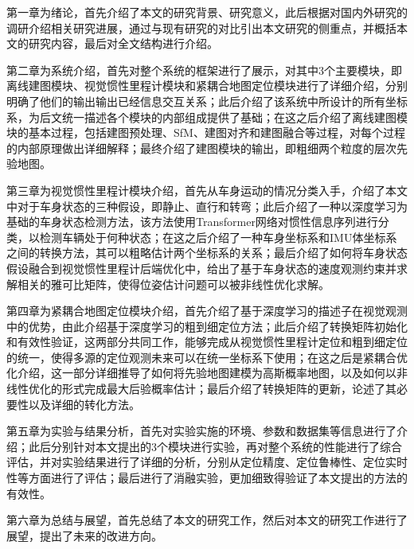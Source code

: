第一章为绪论，首先介绍了本文的研究背景、研究意义，此后根据对国内外研究的调研介绍相关研究进展，通过与现有研究的对比引出本文研究的侧重点，并概括本文的研究内容，最后对全文结构进行介绍。

第二章为系统介绍，首先对整个系统的框架进行了展示，对其中3个主要模块，即离线建图模块、视觉惯性里程计模块和紧耦合地图定位模块进行了详细介绍，分别明确了他们的输出输出已经信息交互关系；此后介绍了该系统中所设计的所有坐标系，为后文统一描述各个模块的内部组成提供了基础；在这之后介绍了离线建图模块的基本过程，包括建图预处理、SfM、建图对齐和建图融合等过程，对每个过程的内部原理做出详细解释；最终介绍了建图模块的输出，即粗细两个粒度的层次先验地图。

第三章为视觉惯性里程计模块介绍，首先从车身运动的情况分类入手，介绍了本文中对于车身状态的三种假设，即静止、直行和转弯；此后介绍了一种以深度学习为基础的车身状态检测方法，该方法使用Transformer网络对惯性信息序列进行分类，以检测车辆处于何种状态；在这之后介绍了一种车身坐标系和IMU体坐标系之间的转换方法，其可以粗略估计两个坐标系的关系；最后介绍了如何将车身状态假设融合到视觉惯性里程计后端优化中，给出了基于车身状态的速度观测约束并求解相关的雅可比矩阵，使得位姿估计问题可以被非线性优化求解。

第四章为紧耦合地图定位模块介绍，首先介绍了基于深度学习的描述子在视觉观测中的优势，由此介绍基于深度学习的粗到细定位方法；此后介绍了转换矩阵初始化和有效性验证，这两部分共同工作，能够完成从视觉惯性里程计定位和粗到细定位的统一，使得多源的定位观测未来可以在统一坐标系下使用；在这之后是紧耦合优化介绍，这一部分详细推导了如何将先验地图建模为高斯概率地图，以及如何以非线性优化的形式完成最大后验概率估计；最后介绍了转换矩阵的更新，论述了其必要性以及详细的转化方法。

第五章为实验与结果分析，首先对实验实施的环境、参数和数据集等信息进行了介绍；此后分别针对本文提出的3个模块进行实验，再对整个系统的性能进行了综合评估，并对实验结果进行了详细的分析，分别从定位精度、定位鲁棒性、定位实时性等方面进行了评估；最后进行了消融实验，更加细致得验证了本文提出的方法的有效性。

第六章为总结与展望，首先总结了本文的研究工作，然后对本文的研究工作进行了展望，提出了未来的改进方向。